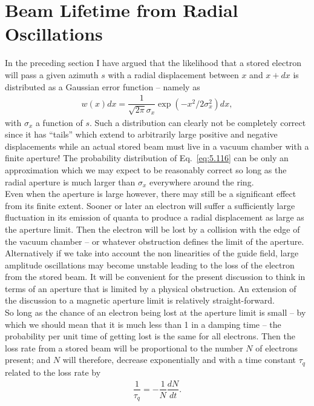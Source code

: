 \section{Beam Lifetime from Radial Oscillations} \label{eq:5.7}

In the preceding section I have argued that the likelihood that a stored electron will pass a given
 azimuth $s$ with a radial displacement between $x$ and $x + dx$ is distributed as a Gaussian error
 function -- namely as
\begin{align}\label{eq:5.116}
	w(x)dx = \dfrac{1}{\sqrt{2\pi}\sigma_x} \exp\left( -x^2/2\sigma_x^2 \right)dx,
\end{align}
with $\sigma_x$ a function of $s$. Such a distribution can clearly not be completely correct
since it has ``tails'' which extend to arbitrarily large positive and negative displacements while an actual stored beam must live in a vacuum chamber with a finite aperture! The probability
 distribution of Eq.~\eqref{eq:5.116} can be only an approximation which we may expect to be reasonably correct so long as the radial aperture is much larger than $\sigma_x$ everywhere around the ring.\\
Even when the aperture is large however, there may still be a significant effect from its finite extent. Sooner or later an electron will suffer a sufficiently large fluctuation in its emission of quanta to produce a radial displacement as large as the aperture limit. Then the electron will be lost by a collision with the edge of the vacuum chamber -- or whatever obstruction defines the limit of the aperture. Alternatively if we take into account the non linearities of the guide field, large amplitude oscillations may become unstable leading to the loss of the electron from the stored beam. It will be convenient for the present discussion to think in terms of an aperture
 that is limited by a physical obstruction. An extension of the discussion to a magnetic aperture
 limit is relatively straight-forward.\\
 So long as the chance of an electron being lost at the aperture limit is small -- by which we should mean that it is much less than 1 in a damping time -- the probability per unit time of getting lost is the same for all electrons. Then the loss rate from a stored beam will be proportional to the number $N$ of electrons present; and $N$ will therefore, decrease exponentially
 and with a time constant $\tau_q$ related to the loss rate by
\begin{align}
	\dfrac{1}{\tau_q} = - \dfrac{1}{N} \dfrac{dN}{dt}.
\end{align}
